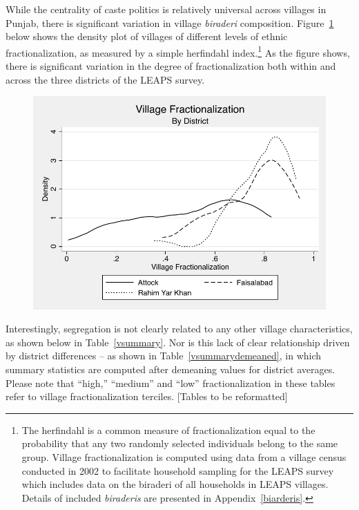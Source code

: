 \documentclass[12pt]{article}
\begin{document}
While the centrality of caste politics is relatively universal across villages in Punjab, there is significant variation in village \emph{biraderi} composition. Figure~\ref{fracdensities} below shows the density plot of villages of different levels of ethnic fractionalization, as measured by a simple herfindahl index.\footnote{The herfindahl is a common measure of fractionalization equal to the probability that any two randomly selected individuals belong to the same group. Village fractionalization is computed using data from a village census conducted in 2002 to facilitate household sampling for the LEAPS survey which includes data on the biraderi of all households in LEAPS villages. Details of included \emph{biraderis} are presented in Appendix~\ref{biarderis}.} As the figure shows, there is significant variation in the degree of fractionalization both within and across the three districts of the LEAPS survey.

\begin{figure}[htb]
	\begin{center}
	\caption{}\label{fracdensities}
	\includegraphics[scale=1.0]{graphs/village_frac_by_district.pdf}
	\end{center}
\end{figure}

Interestingly, segregation is not clearly related to any other village characteristics, as shown below in Table~\ref{vsummary}. Nor is this lack of clear relationship driven by district differences -- as shown in Table~\ref{vsummarydemeaned}, in which summary statistics are computed after demeaning values for district averages. Please note that ``high,'' ``medium'' and ``low'' fractionalization in these tables refer to village fractionalization terciles. [Tables to be reformatted]
\end{document}
